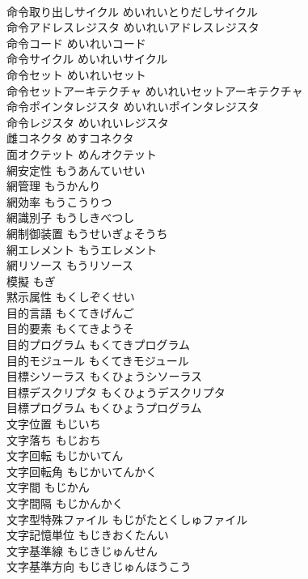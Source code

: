 \documentclass[8pt]{extreport}
\begin{document}
\begin{CJK}{UTF8}{min}
\\	命令取り出しサイクル	めいれいとりだしサイクル	
\\	命令アドレスレジスタ	めいれいアドレスレジスタ	
\\	命令コード	めいれいコード	
\\	命令サイクル	めいれいサイクル	
\\	命令セット	めいれいセット	
\\	命令セットアーキテクチャ	めいれいセットアーキテクチャ	
\\	命令ポインタレジスタ	めいれいポインタレジスタ	
\\	命令レジスタ	めいれいレジスタ	
\\	雌コネクタ	めすコネクタ	
\\	面オクテット	めんオクテット	
\\	網安定性	もうあんていせい	
\\	網管理	もうかんり	
\\	網効率	もうこうりつ	
\\	網識別子	もうしきべつし	
\\	網制御装置	もうせいぎょそうち	
\\	網エレメント	もうエレメント	
\\	網リソース	もうリソース	
\\	模擬	もぎ	
\\	黙示属性	もくしぞくせい	
\\	目的言語	もくてきげんご	
\\	目的要素	もくてきようそ	
\\	目的プログラム	もくてきプログラム	
\\	目的モジュール	もくてきモジュール	
\\	目標シソーラス	もくひょうシソーラス	
\\	目標デスクリプタ	もくひょうデスクリプタ	
\\	目標プログラム	もくひょうプログラム	
\\	文字位置	もじいち	
\\	文字落ち	もじおち	
\\	文字回転	もじかいてん	
\\	文字回転角	もじかいてんかく	
\\	文字間	もじかん	
\\	文字間隔	もじかんかく	
\\	文字型特殊ファイル	もじがたとくしゅファイル	
\\	文字記憶単位	もじきおくたんい	
\\	文字基準線	もじきじゅんせん	
\\	文字基準方向	もじきじゅんほうこう	

\end{CJK}
\end{document}
